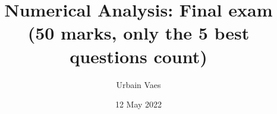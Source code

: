 \documentclass[11pt]{article}
\theoremstyle{definition}
\newtheorem{question}{Question}
\begin{document}
\title{Numerical Analysis: Final exam \\
\small{(\textbf{50 marks}, only the 5 best questions count)}}
\author{Urbain Vaes}
\date{12 May 2022}
\maketitle

% 
% 
% 
% 
% 
% 
% 
% 
\end{document}

